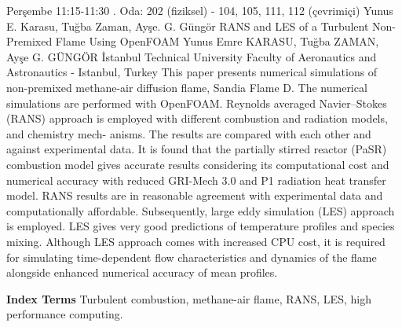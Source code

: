 
    \begin{abstract_basarim}
    {Perşembe 11:15-11:30}
    {.}
    {Oda: 202 (fiziksel) - 104, 105, 111, 112 (çevrimiçi)}
    {Yunus E. Karasu, Tuğba Zaman, Ayşe. G. Güngör}
    {RANS and LES of a Turbulent Non-Premixed Flame Using OpenFOAM}
    {%
    Yunus Emre KARASU, Tuğba ZAMAN, Ayşe G. GÜNGÖR}
    {%
    }
    {%
    İstanbul Technical University Faculty of Aeronautics and Astronautics - Istanbul, Turkey}
    This paper presents numerical simulations of non-premixed methane-air diffusion flame, Sandia Flame D. The numerical simulations are performed with OpenFOAM. Reynolds averaged Navier–Stokes (RANS) approach is employed with different combustion and radiation models, and chemistry mech- anisms. The results are compared with each other and against experimental data. It is found that the partially stirred reactor (PaSR) combustion model gives accurate results considering its computational cost and numerical accuracy with reduced GRI-Mech 3.0 and P1 radiation heat transfer model. RANS results are in reasonable agreement with experimental data and computationally affordable. Subsequently, large eddy simulation (LES) approach is employed. LES gives very good predictions of temperature profiles and species mixing. Although LES approach comes with increased CPU cost, it is required for simulating time-dependent flow characteristics and dynamics of the flame alongside enhanced numerical accuracy of mean profiles. 
    
            \textbf{Index Terms} \newline{}Turbulent combustion, methane-air flame, RANS, LES, high performance computing.
    \end{abstract_basarim}
    